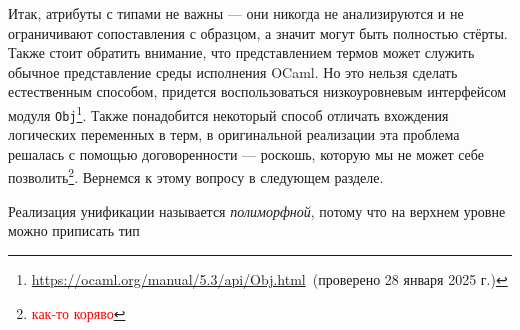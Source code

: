 
Итак, атрибуты с типами не важны --- они никогда не анализируются и не ограничивают сопоставления с образцом, а значит могут быть полностью стёрты.
Также стоит обратить внимание, что представлением термов может служить обычное представление среды исполнения OCaml.
Но это нельзя сделать естественным способом, придется воспользоваться низкоуровневым интерфейсом модуля \lstinline|Obj|\footnote{\url{https://ocaml.org/manual/5.3/api/Obj.html}~(проверено 28 января 2025 г.)}.
Также понадобится некоторый способ отличать вхождения логических переменных в терм, в оригинальной реализации эта проблема решалась с помощью договоренности --- роскошь, которую мы не может себе позволить\footnote{\textcolor{red}{как-то коряво}}.
Вернемся к этому вопросу в следующем разделе.


Реализация унификации называется \emph{полиморфной}, потому что на верхнем уровне можно приписать тип

